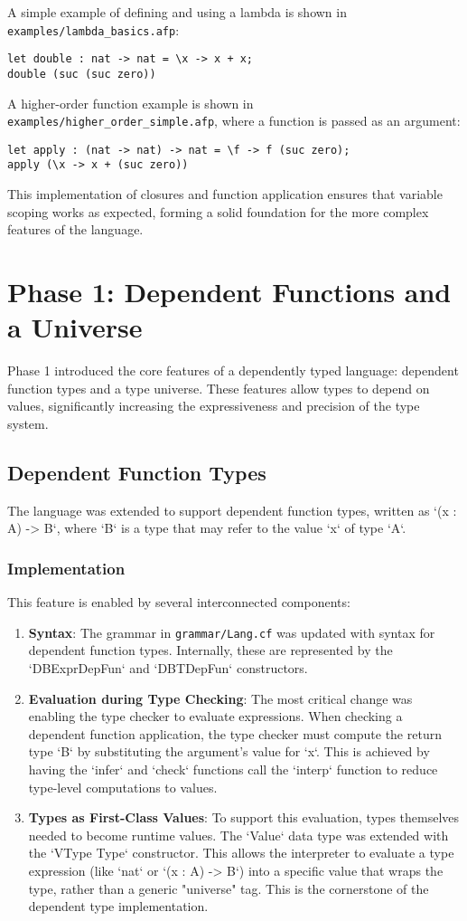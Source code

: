 A simple example of defining and using a lambda is shown in \texttt{examples/lambda\_basics.afp}:
\begin{verbatim}
let double : nat -> nat = \x -> x + x;
double (suc (suc zero))
\end{verbatim}
A higher-order function example is shown in \texttt{examples/higher\_order\_simple.afp}, where a function is passed as an argument:
\begin{verbatim}
let apply : (nat -> nat) -> nat = \f -> f (suc zero);
apply (\x -> x + (suc zero))
\end{verbatim}
This implementation of closures and function application ensures that variable scoping works as expected, forming a solid foundation for the more complex features of the language.

\section{Phase 1: Dependent Functions and a Universe}

Phase 1 introduced the core features of a dependently typed language: dependent function types and a type universe. These features allow types to depend on values, significantly increasing the expressiveness and precision of the type system.

\subsection{Dependent Function Types}

The language was extended to support dependent function types, written as `(x : A) -> B`, where `B` is a type that may refer to the value `x` of type `A`.

\subsubsection{Implementation}
This feature is enabled by several interconnected components:
\begin{enumerate}
    \item \textbf{Syntax}: The grammar in \texttt{grammar/Lang.cf} was updated with syntax for dependent function types. Internally, these are represented by the `DBExprDepFun` and `DBTDepFun` constructors.
    \item \textbf{Evaluation during Type Checking}: The most critical change was enabling the type checker to evaluate expressions. When checking a dependent function application, the type checker must compute the return type `B` by substituting the argument's value for `x`. This is achieved by having the `infer` and `check` functions call the `interp` function to reduce type-level computations to values.
    \item \textbf{Types as First-Class Values}: To support this evaluation, types themselves needed to become runtime values. The `Value` data type was extended with the `VType Type` constructor. This allows the interpreter to evaluate a type expression (like `nat` or `(x : A) -> B`) into a specific value that wraps the type, rather than a generic "universe" tag. This is the cornerstone of the dependent type implementation.
\end{enumerate}

